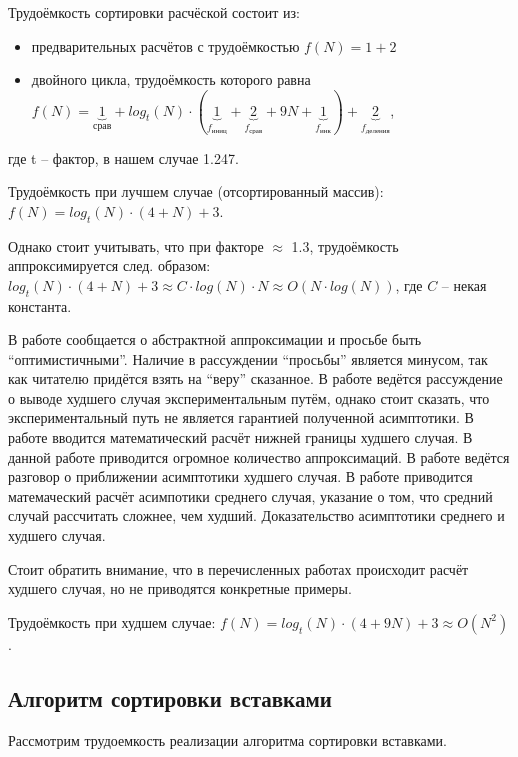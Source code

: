 Трудоёмкость сортировки расчёской состоит из:
\begin{itemize}
	\item предварительных расчётов с трудоёмкостью $f(N) = 1 + 2$
	\item двойного цикла, трудоёмкость которого равна 
	$f(N) = \underbrace{1}_{\text{срав}} + log_t(N) 
	\cdot 
	(\underbrace{1}_{f_\text{иниц}} + \underbrace{2}_{f_\text{срав}} + 9N + \underbrace{1}_{f_\text{инк}}) 
	+ \underbrace{2}_{f_\text{деления}}$,
\end{itemize}
где t -- фактор, в нашем случае 1.247. 

Трудоёмкость при лучшем случае (отсортированный массив): 
$f(N) = log_t(N) \cdot (4 + N) + 3$.

Однако стоит учитывать, что при факторе $\approx$ 1.3, трудоёмкость 
аппроксимируется след. образом: 
$log_t(N) \cdot (4 + N) + 3 \approx C \cdot log(N) \cdot 
N \approx O(N \cdot log(N))$, где $C$ -- некая константа. 

В работе \cite{byte_ocr} сообщается о абстрактной аппроксимации и просьбе быть ``оптимистичными''. 
Наличие в рассуждении ``просьбы'' является минусом, так как читателю придётся взять на ``веру'' сказанное.
В работе \cite{comb_cocktail_counting_sort_compare} ведётся рассуждение о выводе худшего случая экспериментальным
путём, однако стоит сказать, что экспериментальный путь не является гарантией полученной асимптотики.
В работе \cite{kolmogorov_complexity} вводится математический расчёт нижней границы худшего случая. В данной 
работе приводится огромное количество аппроксимаций.
В работе \cite{simd} ведётся разговор о приближении асимптотики худшего случая.
В работе \cite{dobosiewicz_shaker_sort} приводится матемаческий расчёт асимпотики среднего случая, 
указание о том, что средний случай рассчитать сложнее, чем худший.
Доказательство асимптотики среднего и худшего случая.

Стоит обратить внимание, что в перечисленных работах происходит расчёт худшего случая, но не 
приводятся конкретные примеры.

Трудоёмкость при худшем случае: $f(N) =log_t(N) \cdot (4 + 9N) + 3 \approx O(N^2)$.

\subsection{Алгоритм сортировки вставками}

Рассмотрим трудоемкость реализации алгоритма сортировки вставками.

